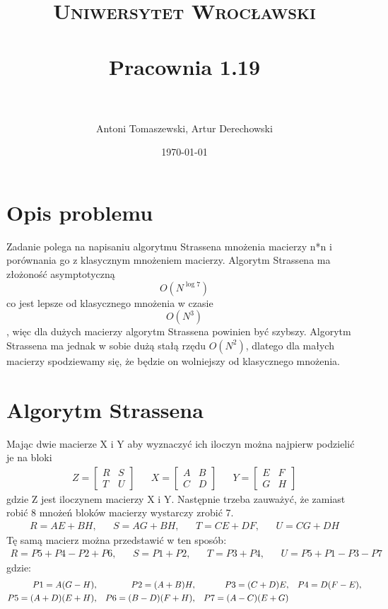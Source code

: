 \documentclass[paper=a4, fontsize=11pt]{scrartcl} %
\title{	
\normalfont \normalsize 
\textsc{Uniwersytet Wrocławski} \\ [25pt] %
\horrule{0.5pt} \\[0.4cm] %
\huge Pracownia 1.19 \\ %
\horrule{2pt} \\[0.5cm] %
}
\author{Antoni Tomaszewski, Artur Derechowski} %
\date{\normalsize\today} %
\numberwithin{equation}{section} %
\numberwithin{figure}{section} %
\numberwithin{table}{section} %
\begin{document}
\maketitle %


\section{Opis problemu}

Zadanie polega na napisaniu algorytmu Strassena mnożenia macierzy n*n  i porównania go z klasycznym mnożeniem macierzy. Algorytm Strassena ma złożoność asymptotyczną 
\[ O(N^{\log 7 } )\]
co jest lepsze od klasycznego mnożenia w czasie \[ O(N^{3} )\], więc dla dużych macierzy algorytm Strassena powinien być szybszy. Algorytm Strassena ma jednak w sobie dużą stałą
rzędu $O(N^2)$, dlatego dla małych macierzy spodziewamy się, że będzie on wolniejszy od klasycznego mnożenia.

\section{Algorytm Strassena}

Mając dwie macierze X i Y aby wyznaczyć ich iloczyn można najpierw podzielić je na bloki
\begin{align}
Z = 
\begin{bmatrix}
R & S \\
T & U
\end{bmatrix} &&
X = 
\begin{bmatrix}
A & B \\
C & D
\end{bmatrix} &&
Y = 
\begin{bmatrix}
E & F \\
G & H
\end{bmatrix}
\end{align}
gdzie Z jest iloczynem macierzy X i Y. Następnie trzeba zauważyć, że zamiast robić 8 mnożeń bloków macierzy wystarczy zrobić 7.\\
\begin{align}
R = AE + BH, && S = AG + BH, && T = CE + DF, && U = CG + DH
\end{align}
Tę samą macierz można przedstawić w ten sposób:\\
\begin{align}
R = P5 + P4 - P2 + P6, && S = P1 + P2, && T = P3 + P4, && U = P5 + P1 - P3 - P7
\end{align}
gdzie:\\
\begin{align}
P1 = A(G - H), && P2 = (A + B)H, && P3 = (C + D)E, && P4 = D(F - E), \notag\\
P5 = (A + D)(E + H), && P6 = (B - D)(F + H), && P7 = (A - C)(E + G)
\end{align}
\end{document}
